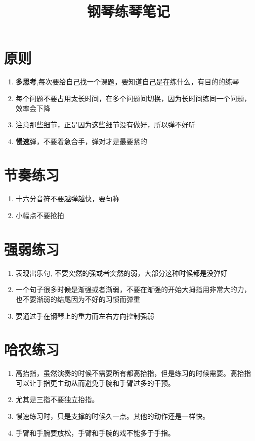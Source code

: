 \documentclass[UTF8]{ctexart}
\title{钢琴练琴笔记}
\begin{document}
\maketitle

\section{原则}

\begin{enumerate}
    \item \textbf{多思考},每次要给自己找一个课题，要知道自己是在练什么，有目的的练琴
    \item 每个问题不要占用太长时间，在多个问题间切换，因为长时间练同一个问题，效率会下降
    \item 注意那些细节，正是因为这些细节没有做好，所以弹不好听
    \item \textbf{慢速}弹，不要着急合手，弹对才是最要紧的
\end{enumerate}

\section{节奏练习}

\begin{enumerate}
    \item 十六分音符不要越弹越快，要匀称 
    \item 小幅点不要抢拍 
\end{enumerate}


\section{强弱练习}

\begin{enumerate} 
    \item 表现出乐句, 不要突然的强或者突然的弱，大部分这种时候都是没弹好
    \item 一个句子很多时候是渐强或者渐弱，不要在渐强的开始大拇指用非常大的力，也不要渐弱的结尾因为不好的习惯而弹重
    \item 要通过手在钢琴上的重力而左右方向控制强弱 
\end{enumerate}



\section{哈农练习}

\begin{enumerate}
    \item 高抬指，虽然演奏的时候不需要所有都高抬指，但是练习的时候需要。高抬指可以让手指更主动从而避免手腕和手臂过多的干预。
    \item 尤其是三指不要独立抬指。
    \item 慢速练习时，只是支撑的时候久一点。其他的动作还是一样快。
    \item 手臂和手腕要放松，手臂和手腕的戏不能多于手指。
\end{enumerate}
\end{document}
